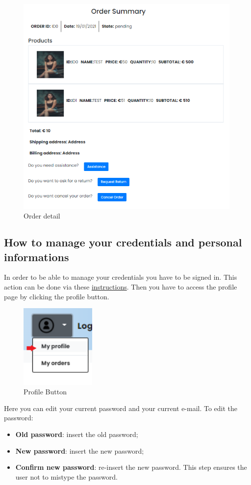 \begin{figure}[H]
    \centering
    \includegraphics[width=30em]{res/images/cliente/order.png}
    \caption{Order detail}
\end{figure}

\subsection{How to manage your credentials and personal informations} \label{_credentials}
In order to be able to manage your credentials you have to be signed in. This action can be done via these \hyperref[_signin]{instructions}.
Then you have to access the profile page by clicking the profile button.
\begin{figure}[H]
    \centering
    \includegraphics[width=10em]{res/images/cliente/profileaccount.png}
    \caption{Profile Button}
\end{figure}

Here you can edit your current password and your current e-mail.
To edit the password:
\begin{itemize} 
    \item \textbf{Old password}: insert the old password;
    \item \textbf{New password}: insert the new password; 
    \item \textbf{Confirm new password}: re-insert the new password. This step ensures the user not to  mistype the password.
\end{itemize}

